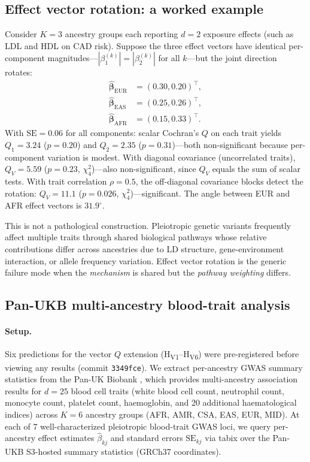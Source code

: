 \documentclass[11pt]{article}
\begin{document}
\subsection{Effect vector rotation: a worked example}
\label{sec:vector-rotation}

Consider $K = 3$ ancestry groups each reporting $d = 2$ exposure effects (such as LDL and HDL on CAD risk). Suppose the three effect vectors have identical per-component magnitudes---$|\beta_1^{(k)}| = |\beta_2^{(k)}|$ for all $k$---but the joint direction rotates:
\begin{align}
    \hat{\boldsymbol{\beta}}_{\mathrm{EUR}} &= (0.30, 0.20)^\top, \nonumber \\
    \hat{\boldsymbol{\beta}}_{\mathrm{EAS}} &= (0.25, 0.26)^\top, \nonumber \\
    \hat{\boldsymbol{\beta}}_{\mathrm{AFR}} &= (0.15, 0.33)^\top. \nonumber
\end{align}
With $\mathrm{SE} = 0.06$ for all components: scalar Cochran's $Q$ on each trait yields $Q_1 = 3.24$ ($p = 0.20$) and $Q_2 = 2.35$ ($p = 0.31$)---both non-significant because per-component variation is modest. With diagonal covariance (uncorrelated traits), $Q_V = 5.59$ ($p = 0.23$, $\chi^2_4$)---also non-significant, since $Q_V$ equals the sum of scalar tests. With trait correlation $\rho = 0.5$, the off-diagonal covariance blocks detect the rotation: $Q_V = 11.1$ ($p = 0.026$, $\chi^2_4$)---significant. The angle between EUR and AFR effect vectors is $31.9^\circ$.

This is not a pathological construction. Pleiotropic genetic variants frequently affect multiple traits through shared biological pathways whose relative contributions differ across ancestries due to LD structure, gene-environment interaction, or allele frequency variation. Effect vector rotation is the generic failure mode when the \emph{mechanism} is shared but the \emph{pathway weighting} differs.

\subsection{Pan-UKB multi-ancestry blood-trait analysis}
\label{sec:vector-jass}

\paragraph{Setup.}
Six predictions for the vector $Q$ extension (H\textsubscript{V1}--H\textsubscript{V6}) were pre-registered before viewing any results (commit \texttt{3349fce}).
We extract per-ancestry GWAS summary statistics from the Pan-UK Biobank \citep{karczewski2025panukb}, which provides multi-ancestry association results for $d = 25$ blood cell traits (white blood cell count, neutrophil count, monocyte count, platelet count, haemoglobin, and 20 additional haematological indices) across $K = 6$ ancestry groups (AFR, AMR, CSA, EAS, EUR, MID). At each of 7 well-characterized pleiotropic blood-trait GWAS loci, we query per-ancestry effect estimates $\hat{\beta}_{kj}$ and standard errors $\mathrm{SE}_{kj}$ via tabix over the Pan-UKB S3-hosted summary statistics (GRCh37 coordinates).
\end{document}
